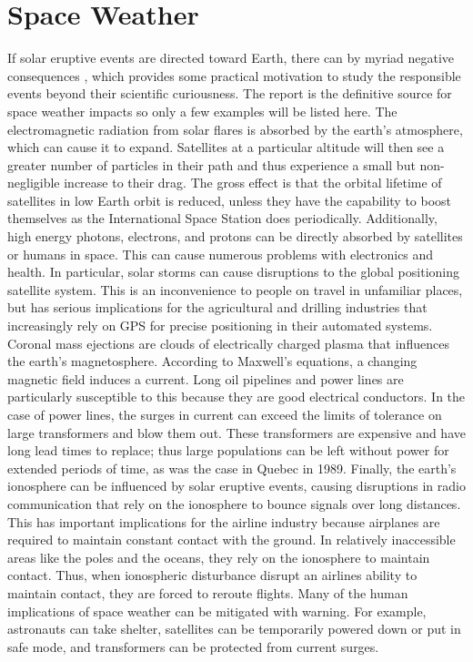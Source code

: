 \section{Space Weather}
\label{sec:spaceweather}
If solar eruptive events are directed toward Earth, there can by myriad negative consequences \citep{NRC2008}, which provides some practical motivation to study the responsible events beyond their scientific curiousness. The \citet{NRC2008} report is the definitive source for space weather impacts so only a few examples will be listed here. The electromagnetic radiation from solar flares is absorbed by the earth's atmosphere, which can cause it to expand. Satellites at a particular altitude will then see a greater number of particles in their path and thus experience a small but non-negligible increase to their drag. The gross effect is that the orbital lifetime of satellites in low Earth orbit is reduced, unless they have the capability to boost themselves as the International Space Station does periodically. Additionally, high energy photons, electrons, and protons can be directly absorbed by satellites or humans in space. This can cause numerous problems with electronics and health. In particular, solar storms can cause disruptions to the global positioning satellite system. This is an inconvenience to people on travel in unfamiliar places, but has serious implications for the agricultural and drilling industries that increasingly rely on GPS for precise positioning in their automated systems. Coronal mass ejections are clouds of electrically charged plasma that influences the earth's magnetosphere. According to Maxwell's equations, a changing magnetic field induces a current. Long oil pipelines and power lines are particularly susceptible to this because they are good electrical conductors. In the case of power lines, the surges in current can exceed the limits of tolerance on large transformers and blow them out. These transformers are expensive and have long lead times to replace; thus large populations can be left without power for extended periods of time, as was the case in Quebec in 1989. Finally, the earth's ionosphere can be influenced by solar eruptive events, causing disruptions in radio communication that rely on the ionosphere to bounce signals over long distances. This has important implications for the airline industry because airplanes are required to maintain constant contact with the ground. In relatively inaccessible areas like the poles and the oceans, they rely on the ionosphere to maintain contact. Thus, when ionospheric disturbance disrupt an airlines ability to maintain contact, they are forced to reroute flights. Many of the human implications of space weather can be mitigated with warning. For example, astronauts can take shelter, satellites can be temporarily powered down or put in safe mode, and transformers can be protected from current surges. 

